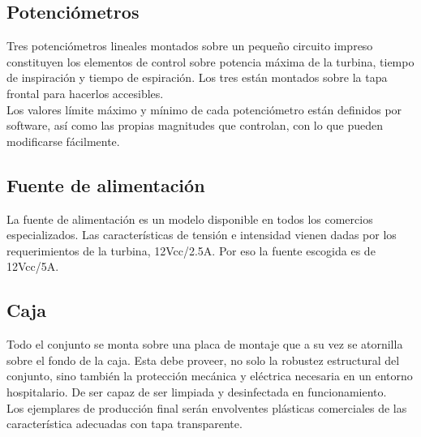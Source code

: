 \subsection{Potenciómetros}
    Tres potenciómetros lineales montados sobre un pequeño circuito impreso constituyen los elementos de control sobre potencia máxima de la turbina, tiempo de inspiración y tiempo de espiración. Los tres están montados sobre la tapa frontal para hacerlos accesibles.\\
    Los valores límite máximo y mínimo de cada potenciómetro están definidos por software, así como las propias magnitudes que controlan, con lo que pueden modificarse fácilmente.
\subsection{Fuente de alimentación}
    La fuente de alimentación es un modelo disponible en todos los comercios especializados. Las características de tensión e intensidad vienen dadas por los requerimientos de la turbina, 12Vcc/2.5A. Por eso la fuente escogida es de 12Vcc/5A.
\subsection{Caja}
    Todo el conjunto se monta sobre una placa de montaje que a su vez se atornilla sobre el fondo de la caja. Esta debe proveer, no solo la robustez estructural del conjunto, sino también la protección mecánica y eléctrica necesaria en un entorno hospitalario. De ser capaz de ser limpiada y desinfectada en funcionamiento.\\
    Los ejemplares de producción final serán envolventes plásticas comerciales de las característica adecuadas con tapa transparente.